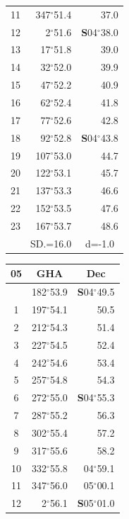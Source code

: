 \documentclass[10pt, a4paper]{report}
\begin{document}
\begin{scriptsize}
\begin{tabular*}{0.2\textwidth}[t]{@{\extracolsep{\fill}}|c|rr|}
11 & 347$^\circ$51.4 & 37.0\\[2Pt]
12 & 2$^\circ$51.6 & \textbf{S}04$^\circ$38.0\\
13 & 17$^\circ$51.8 & 39.0\\
14 & 32$^\circ$52.0 & 39.9\\
15 & 47$^\circ$52.2 & \raisebox{0.24ex}{\boldmath$\cdot$~\boldmath$\cdot$~~}40.9\\
16 & 62$^\circ$52.4 & 41.8\\
17 & 77$^\circ$52.6 & 42.8\\[2Pt]
18 & 92$^\circ$52.8 & \textbf{S}04$^\circ$43.8\\
19 & 107$^\circ$53.0 & 44.7\\
20 & 122$^\circ$53.1 & 45.7\\
21 & 137$^\circ$53.3 & \raisebox{0.24ex}{\boldmath$\cdot$~\boldmath$\cdot$~~}46.6\\
22 & 152$^\circ$53.5 & 47.6\\
23 & 167$^\circ$53.7 & 48.6\\
\hline
\rule{0pt}{2.4ex} & \multicolumn{1}{c}{SD.=16.0} & \multicolumn{1}{c|}{d=-1.0}\\
\hline
\end{tabular*}\noindent
\begin{tabular*}{0.2\textwidth}[t]{@{\extracolsep{\fill}}|c|rr|}
\hline
\multicolumn{1}{|c|}{\rule{0pt}{2.6ex}\textbf{05}} & \multicolumn{1}{c}{\textbf{GHA}} & \multicolumn{1}{c|}{\textbf{Dec}}\\
\hline\rule{0pt}{2.6ex}\noindent
0 & 182$^\circ$53.9 & \textbf{S}04$^\circ$49.5\\
1 & 197$^\circ$54.1 & 50.5\\
2 & 212$^\circ$54.3 & 51.4\\
3 & 227$^\circ$54.5 & \raisebox{0.24ex}{\boldmath$\cdot$~\boldmath$\cdot$~~}52.4\\
4 & 242$^\circ$54.6 & 53.4\\
5 & 257$^\circ$54.8 & 54.3\\[2Pt]
6 & 272$^\circ$55.0 & \textbf{S}04$^\circ$55.3\\
7 & 287$^\circ$55.2 & 56.3\\
8 & 302$^\circ$55.4 & 57.2\\
9 & 317$^\circ$55.6 & \raisebox{0.24ex}{\boldmath$\cdot$~\boldmath$\cdot$~~}58.2\\
10 & 332$^\circ$55.8 & 04$^\circ$59.1\\
11 & 347$^\circ$56.0 & 05$^\circ$00.1\\[2Pt]
12 & 2$^\circ$56.1 & \textbf{S}05$^\circ$01.0\\

\end{tabular*}
\end{scriptsize}
\end{document}
